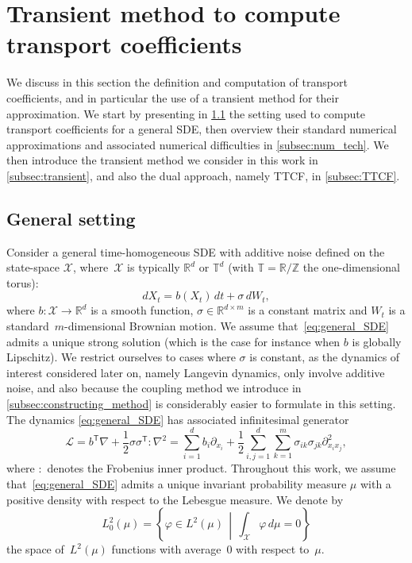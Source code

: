 \documentclass[11pt]{article}
\newcommand{\T}{\mathbb{T}}
\newcommand{\Z}{\mathbb{Z}}
\newcommand{\R}{\mathbb{R}}
\newcommand{\X}{\mathcal{X}}
\renewcommand{\L}{\mathcal{L}}
\renewcommand{\t}{\mathsf T}
\theoremstyle{definition}
\begin{document}
\section{Transient method to compute transport coefficients}
\label{sec:trans_coeff}
We discuss in this section the definition and computation of transport coefficients, and in particular the use of a transient method for their approximation. We start by presenting in \cref{subsec:gen_setting} the setting used to compute transport coefficients for a general SDE, then overview their standard numerical approximations and associated numerical difficulties in \cref{subsec:num_tech}. We then introduce the transient method we consider in this work in \cref{subsec:transient}, and also the dual approach, namely TTCF, in \cref{subsec:TTCF}. 

\subsection{General setting}
\label{subsec:gen_setting}
Consider a general time-homogeneous SDE with additive noise defined on the state-space $\mathcal{X}$, where~$\mathcal{X}$ is typically $\R^d$ or $\T^d$ (with $\T = \R/\Z$ the one-dimensional torus):
\begin{equation}
    dX_t = b(X_t) \, dt + \sigma \, dW_t,
    \label{eq:general_SDE}
\end{equation}
where $b\colon \mathcal{X} \to \R^d$ is a smooth function, $\sigma \in \R^{d\times m}$ is a constant matrix and $W_t$ is a standard~$m$-dimensional Brownian motion. We assume that~\eqref{eq:general_SDE} admits a unique strong solution (which is the case for instance when $b$ is globally Lipschitz). We restrict ourselves to cases where $\sigma$ is constant, as the dynamics of interest considered later on, namely Langevin dynamics, only involve additive noise, and also because the coupling method we introduce in \cref{subsec:constructing_method} is considerably easier to formulate in this setting. The dynamics \eqref{eq:general_SDE} has associated infinitesimal generator
\begin{equation}
    \L = b^\t\nabla + \frac{1}{2}\sigma\sigma^\t \colon \nabla^2 = \sum_{i=1}^d b_i\partial_{x_i} + \frac{1}{2}\sum_{i,j=1}^d\sum_{k=1}^m \sigma_{ik}\sigma_{jk} \partial_{x_ix_j}^2,
    \label{eq:general_generator}
\end{equation}
where $\colon$ denotes the Frobenius inner product. Throughout this work, we assume that~\eqref{eq:general_SDE} admits a unique invariant probability measure $\mu$ with a positive density with respect to the Lebesgue measure. 
We denote by 
\[
L^2_0(\mu) = \left\{\varphi \in L^2(\mu) \, \middle| \, \int_\X \varphi \, d\mu = 0\right\}
\]
the space of~$L^2(\mu)$ functions with average~0 with respect to~$\mu$.
\end{document}
